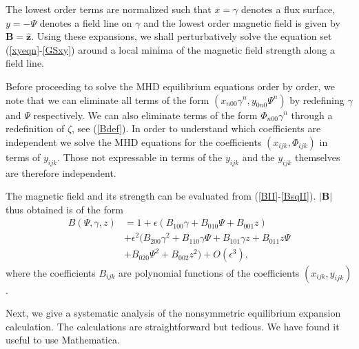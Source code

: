 \documentclass[aip,pop,reprint]{revtex4-1}
\newcommand*{\B}{\bm{B}}
\newcommand*{\zh}{\bm{\hat{z}}}
\begin{document}
 The lowest order terms are normalized such that $x=\gamma$ denotes a flux surface, $y=-\Psi$ denotes a field line on $\gamma$ and the lowest order magnetic field is given by $\B= \zh$. Using these expansions, we shall perturbatively solve the equation set (\ref{xyeqn}-\ref{GSxy}) around a local minima of the magnetic field strength along a field line. 
 
 Before proceeding to solve the MHD equilibrium equations order by order, we note that we can eliminate all terms of the form $(x_{n00}\gamma^n,y_{0n0}\Psi^n)$ by redefining $\gamma$ and $\Psi$ respectively. We can also eliminate terms of the form $\Phi_{n00}\gamma^n$ through a redefinition of $\zeta$, see (\ref{Bdef}). In order to understand which coefficients are independent we solve the MHD equations for the coefficients $(x_{ijk},\Phi_{ijk})$ in terms of $y_{ijk}$. Those not expressable in terms of the $y_{ijk}$ and the $y_{ijk}$ themselves are therefore independent. 
 
The magnetic field and its strength can be evaluated from (\ref{BII}-\ref{BsqII}). $|\B|$ thus obtained is of the form
\begin{align}
B(\Psi,\gamma,z)&= 1 +\epsilon (B_{100}\gamma +B_{010}\Psi +B_{001}z)\nonumber \\
&+\epsilon^2(B_{200} \gamma^2 + B_{110} \gamma \Psi + B_{101} \gamma z+ B_{011} z \Psi  \nonumber\\
&+ B_{020} \Psi^2 +B_{002} z^2)+ O(\epsilon^3), \label{Bexpan}
\end{align}
where the coefficients $B_{ijk}$ are polynomial functions of the coefficients $(x_{ijk},y_{ijk})$.

Next, we give a systematic analysis of the nonsymmetric equilibrium expansion calculation. The calculations are straightforward but tedious. We have found it useful to use Mathematica.
\end{document}
